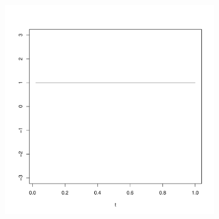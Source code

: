 \begin{figure}
	
	\centering 
	\begin{subfigure}
		[b]{0.32 
		\textwidth} \centering 
		\includegraphics[width=0.99 
		\textwidth]{Images-future-work/ef0.pdf} \caption{} \label{} 
	\end{subfigure}
	

\end{figure}
